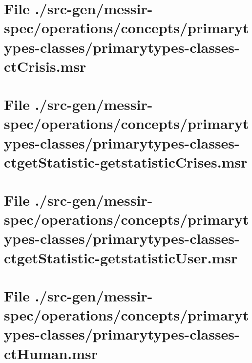 \section[File /src-gen/messir-spec/operations.../primarytypes-classes-ctCrisis.msr]{File ./src-gen/messir-spec/operations/concepts/primarytypes-classes/primarytypes-classes-ctCrisis.msr}
\scriptsize

\normalsize
	
\section[File /src-gen.../primarytypes-classes-ctgetStatistic-getstatisticCrises.msr]{File ./src-gen/messir-spec/operations/concepts/primarytypes-classes/primarytypes-classes-ctgetStatistic-getstatisticCrises.msr}
\scriptsize

\normalsize
	
\section[File /src-gen.../primarytypes-classes-ctgetStatistic-getstatisticUser.msr]{File ./src-gen/messir-spec/operations/concepts/primarytypes-classes/primarytypes-classes-ctgetStatistic-getstatisticUser.msr}
\scriptsize

\normalsize
	
\section[File /src-gen/messir-spec/operations.../primarytypes-classes-ctHuman.msr]{File ./src-gen/messir-spec/operations/concepts/primarytypes-classes/primarytypes-classes-ctHuman.msr}
\scriptsize

\normalsize
	
